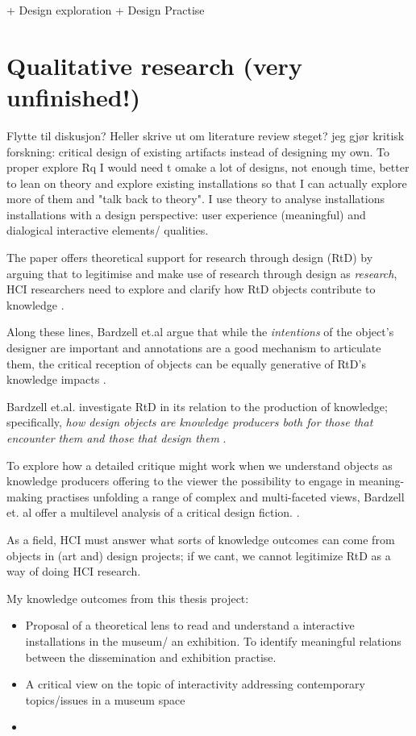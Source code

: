 + Design exploration
+ Design Practise


\section{Qualitative research (very unfinished!)}
Flytte til diskusjon? Heller skrive ut om literature review steget?
jeg gjør kritisk forskning: critical design of existing artifacts instead of designing my own. To proper explore Rq I would need t omake a lot of designs, not enough time, better to lean on theory and explore existing installations so that I can actually explore more of them and "talk back to theory". I use theory to analyse installations installations with a design perspective: user experience (meaningful) and dialogical interactive elements/ qualities. 

The paper offers theoretical support for research through design (RtD) by arguing that to legitimise and make use of research through design as \emph{research}, HCI researchers need to explore and clarify how RtD objects contribute to knowledge \autocite[p.2093]{bardzell_immodest_2015}.


Along these lines, Bardzell et.al argue that while the \emph{intentions} of the object's designer are important and annotations are a good mechanism to articulate them, the critical reception of objects can be equally generative of RtD's knowledge impacts \autocite[p. 2093]{bardzell_immodest_2015}.

Bardzell et.al. investigate RtD in its relation to the production of knowledge; specifically, \emph{how design objects are knowledge producers both for those that encounter them and those that design them} \autocite[p. 2093]{bardzell_immodest_2015}. 

To explore how a detailed critique might work when we understand objects as knowledge producers offering to the viewer the possibility to engage in meaning-making practises unfolding a range of complex and multi-faceted views, Bardzell et. al offer a multilevel analysis of a critical design fiction. \autocite[p. 2094]{bardzell_immodest_2015}.

As a field, HCI must answer what sorts of knowledge outcomes can come from objects in (art and) design projects; if we cant, we cannot legitimize RtD as a way of doing HCI research.

My knowledge outcomes from this thesis project:
\begin{itemize}
    \item Proposal of a theoretical lens to read and understand a interactive installations in the museum/ an exhibition. To identify meaningful relations between the dissemination and exhibition practise.
    \item A critical view on the topic of interactivity addressing contemporary topics/issues in a museum space
    \item 
\end{itemize}

